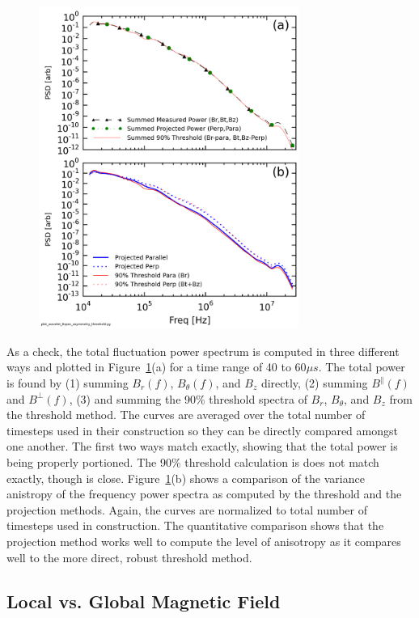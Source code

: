 \documentclass[aip,prl,amsmath,amssymb,reprint,superscriptaddress]{revtex4-1} %
\begin{document}
\begin{figure}[!htbp]
\centerline{
\includegraphics[width=8.5cm]{Bperppara_spectra_thresholdvsprojection40t60us}}
\caption{\label{fig:powercomparison}}
\end{figure}

As a check, the total fluctuation power spectrum is computed in three different ways and plotted in Figure~\ref{fig:powercomparison}(a) for a time range of 40 to 60$\mu s$. The total power is found by (1) summing $B_{r}(f)$, $B_{\theta}(f)$, and $B_{z}$ directly, (2) summing $B^{\parallel}(f)$ and $B^{\perp}(f)$, (3) and summing the 90\% threshold spectra of $B_{r}$, $B_{\theta}$, and $B_{z}$ from the threshold method. The curves are averaged over the total number of timesteps used in their construction so they can be directly compared amongst one another. The first two ways match exactly, showing that the total power is being properly portioned. The 90\% threshold calculation is does not match exactly, though is close. Figure~\ref{fig:powercomparison}(b) shows a comparison of the variance anistropy of the frequency power spectra as computed by the threshold and the projection methods. Again, the curves are normalized to total number of timesteps used in construction. The quantitative comparison shows that the projection method works well to compute the level of anisotropy as it compares well to the more direct, robust threshold method.

\subsection{Local vs. Global Magnetic Field}
\end{document}
